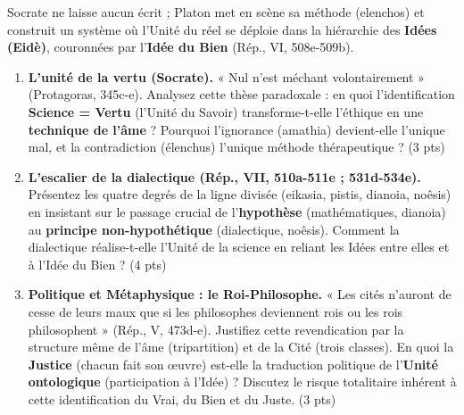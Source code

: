 \documentclass[11pt]{article}
\begin{document}
\begin{exercice}
Socrate ne laisse aucun écrit ; Platon met en scène sa méthode (elenchos) et construit un système où l'Unité du réel se déploie dans la hiérarchie des \textbf{Idées (Eidè)}, couronnées par l'\textbf{Idée du Bien} (Rép., VI, 508e-509b).

\begin{enumerate}
    \item \textbf{L'unité de la vertu (Socrate).} « Nul n'est méchant volontairement » (Protagoras, 345c-e). Analysez cette thèse paradoxale : en quoi l'identification \textbf{Science = Vertu} (l'Unité du Savoir) transforme-t-elle l'éthique en une \textbf{technique de l'âme} ? Pourquoi l'ignorance (amathia) devient-elle l'unique mal, et la contradiction (élenchus) l'unique méthode thérapeutique ? (3 pts)
    \item \textbf{L'escalier de la dialectique (Rép., VII, 510a-511e ; 531d-534e).} Présentez les quatre degrés de la ligne divisée (eikasia, pistis, dianoia, noêsis) en insistant sur le passage crucial de l'\textbf{hypothèse} (mathématiques, dianoia) au \textbf{principe non-hypothétique} (dialectique, noêsis). Comment la dialectique réalise-t-elle l'Unité de la science en reliant les Idées entre elles et à l'Idée du Bien ? (4 pts)
    \item \textbf{Politique et Métaphysique : le Roi-Philosophe.} « Les cités n'auront de cesse de leurs maux que si les philosophes deviennent rois ou les rois philosophent » (Rép., V, 473d-e). Justifiez cette revendication par la structure même de l'âme (tripartition) et de la Cité (trois classes). En quoi la \textbf{Justice} (chacun fait son œuvre) est-elle la traduction politique de l'\textbf{Unité ontologique} (participation à l'Idée) ? Discutez le risque totalitaire inhérent à cette identification du Vrai, du Bien et du Juste. (3 pts)
\end{enumerate}
\end{exercice}
\end{document}
